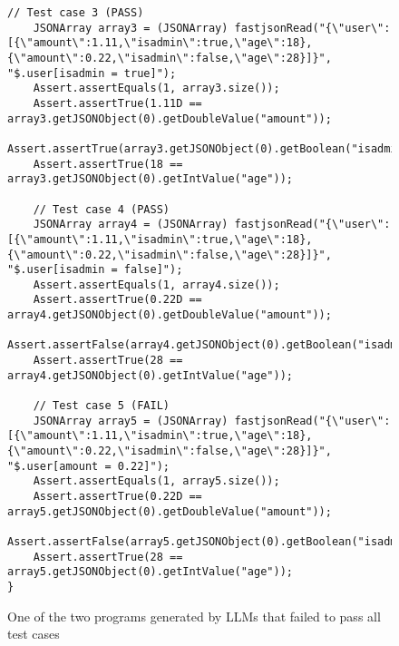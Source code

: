\begin{figure}
\begin{lstlisting}[style = Java-github]
    // Test case 3 (PASS)
    JSONArray array3 = (JSONArray) fastjsonRead("{\"user\":[{\"amount\":1.11,\"isadmin\":true,\"age\":18},{\"amount\":0.22,\"isadmin\":false,\"age\":28}]}", "$.user[isadmin = true]");
    Assert.assertEquals(1, array3.size());
    Assert.assertTrue(1.11D == array3.getJSONObject(0).getDoubleValue("amount"));
    Assert.assertTrue(array3.getJSONObject(0).getBoolean("isadmin"));
    Assert.assertTrue(18 == array3.getJSONObject(0).getIntValue("age"));

    // Test case 4 (PASS)
    JSONArray array4 = (JSONArray) fastjsonRead("{\"user\":[{\"amount\":1.11,\"isadmin\":true,\"age\":18},{\"amount\":0.22,\"isadmin\":false,\"age\":28}]}", "$.user[isadmin = false]");
    Assert.assertEquals(1, array4.size());
    Assert.assertTrue(0.22D == array4.getJSONObject(0).getDoubleValue("amount"));
    Assert.assertFalse(array4.getJSONObject(0).getBoolean("isadmin"));
    Assert.assertTrue(28 == array4.getJSONObject(0).getIntValue("age"));

    // Test case 5 (FAIL)
    JSONArray array5 = (JSONArray) fastjsonRead("{\"user\":[{\"amount\":1.11,\"isadmin\":true,\"age\":18},{\"amount\":0.22,\"isadmin\":false,\"age\":28}]}", "$.user[amount = 0.22]");
    Assert.assertEquals(1, array5.size());
    Assert.assertTrue(0.22D == array5.getJSONObject(0).getDoubleValue("amount"));
    Assert.assertFalse(array5.getJSONObject(0).getBoolean("isadmin"));
    Assert.assertTrue(28 == array5.getJSONObject(0).getIntValue("age"));
}
    \end{lstlisting}

\caption{One of the two programs generated by LLMs that failed to pass all test cases}
\label{fig:figure7} 
\end{figure}



